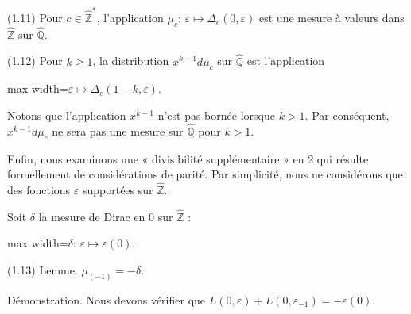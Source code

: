 \documentclass[11pt]{article}
\newcommand{\DFormula}[1]{\par\smallskip\noindent\begin{adjustbox}{max width=\linewidth}$\displaystyle #1$\end{adjustbox}\par\smallskip}
\begin{document}
\par
(1.11) Pour \(c\in \widehat{\mathbb{Z}}^{\ast}\), l’application \(\mu _{c}\): \(\varepsilon \mapsto \Delta _{c}(0,\varepsilon )\) est une mesure à valeurs dans \(\widehat{\mathbb{Z}}\) sur \(\widehat{\mathbb{Q}}\).\par
\par
(1.12) Pour \(k\geq 1\), la distribution \(x^{k-1}d\mu _{c}\) sur \(\widehat{\mathbb{Q}}\) est l’application\par
\par
\DFormula{\varepsilon \mapsto \Delta _{c}(1-k,\varepsilon ).}
\par
Notons que l’application \(x^{k-1}\) n’est pas bornée lorsque \(k>1\). Par conséquent, \(x^{k-1}d\mu _{c}\) ne sera pas une mesure sur \(\widehat{\mathbb{Q}}\) pour \(k>1\).\par
\par
Enfin, nous examinons une « divisibilité supplémentaire » en 2 qui résulte formellement de considérations de parité. Par simplicité, nous ne considérons que des fonctions \(\varepsilon \) supportées sur \(\widehat{\mathbb{Z}}\).\par
\par
Soit \(\delta \) la mesure de Dirac en 0 sur \(\widehat{\mathbb{Z}}\) :\par
\par
\DFormula{\delta :\,\varepsilon \mapsto \varepsilon (0).}
\par
(1.13) Lemme. \(\mu _{(-1)}=-\delta \).\par
\par
Démonstration. Nous devons vérifier que \(L(0,\varepsilon )+L(0,\varepsilon _{-1})=-\varepsilon (0)\).\par
\par
\end{document}
